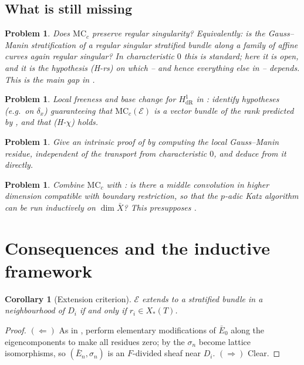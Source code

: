 \documentclass[11pt,reqno]{amsart}
\newcommand{\cE}{\mathcal{E}}
\newcommand{\MC}{\mathrm{MC}}
\newcommand{\Xst}{X_*(T)}
\newcommand{\dR}{\mathrm{dR}}
\theoremstyle{plain}
\newtheorem{corollary}[theorem]{Corollary}
\newtheorem{problem}[theorem]{Problem}
\theoremstyle{definition}
\theoremstyle{remark}
\numberwithin{equation}{section}
\begin{document}
\subsection{What is still missing}

\begin{problem}\label{prob:MCrs}
Does $\MC_c$ preserve regular singularity?  Equivalently: is the
Gauss--Manin stratification of a regular singular stratified bundle along
a family of affine curves again regular singular?  In characteristic $0$
this is standard; here it is open, and it is the hypothesis (H-rs) on
which  -- and hence everything else in  --
depends.  This is the main gap in .
\end{problem}

\begin{problem}\label{prob:MClf}
Local freeness and base change for $H^1_{\dR}$ in : identify
hypotheses (e.g.\ on $\delta_x$) guaranteeing that $\MC_c(\cE)$ is a
vector bundle of the rank predicted by , and that
(H-$\chi$) holds.
\end{problem}

\begin{problem}\label{prob:MCintrinsic}
Give an intrinsic proof of  by computing the local
Gauss--Manin residue, independent of the transport from
characteristic $0$, and deduce  from it directly.
\end{problem}

\begin{problem}
Combine $\MC_c$ with : is there a middle convolution in
higher dimension compatible with boundary restriction, so that the
$p$-adic Katz algorithm can be run inductively on $\dim\bar X$?  This
presupposes .
\end{problem}

\section{Consequences and the inductive framework}\label{sec:applications}

\begin{corollary}[Extension criterion]\label{cor:extension}
$\cE$ extends to a stratified bundle in a neighbourhood of $D_i$ if and
only if $r_i\in\Xst$.
\end{corollary}
\begin{proof}
$(\Leftarrow)$ As in , perform elementary
modifications of $\bar E_0$ along the eigencomponents to make all
residues zero; by  the $\sigma_n$ become lattice
isomorphisms, so $(\bar E_n,\sigma_n)$ is an $F$-divided sheaf near $D_i$.
$(\Rightarrow)$ Clear.
\end{proof}
\end{document}
